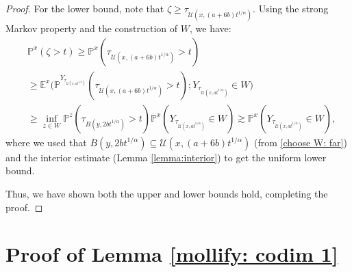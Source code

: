 \documentclass[12pt,a4paper]{amsart}
\numberwithin{equation}{section}
\theoremstyle{plain}
\newcommand{\mc}{\mathcal}
\newcommand{\mb}{\mathbb}
\newcommand{\1}{\mathbbm{1}}
\begin{document}
\begin{proof}
For the lower bound, note that $\zeta \ge \tau_{\mc U(x,(a+6b)t^{1/\alpha})}$. Using the strong Markov property and the construction of $W$, we have:
\begin{align*}
& \mb P^x(\zeta > t) \ge \mb P^x(\tau_{\mc U(x,(a+6b)t^{1/\alpha})} > t) \\
& \ge \mb E^x\big(\mb P^{Y_{\tau_{\mc U(x,at^{1/\alpha})}}}(\tau_{\mc U(x,(a+6b)t^{1/\alpha})} > t); Y_{\tau_{\mc U(x,at^{1/\alpha})}} \in W\big) \\
& \ge \inf_{z \in W} \mb P^z(\tau_{B(y,2bt^{1/\alpha})}>t) \mb P^x(Y_{\tau_{\mc U(x,at^{1/\alpha})}} \in W) \gtrsim \mb P^x(Y_{\tau_{\mc U(x,at^{1/\alpha})}} \in W),
\end{align*}
where we used that $B(y,2bt^{1/\alpha}) \subseteq \mc U(x,(a+6b)t^{1/\alpha})$ (from \eqref{choose W: far}) and the interior estimate (Lemma \ref{lemma:interior}) to get the uniform lower bound.

Thus, we have shown both the upper and lower bounds hold, completing the proof.
\end{proof}


\section{Proof of Lemma \ref{mollify: codim 1}}\label{app:proof of mollify}
\end{document}
